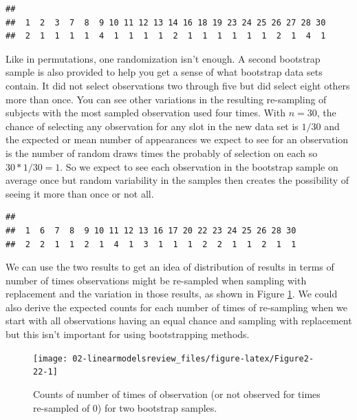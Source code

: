 \documentclass[
]{book}
\newenvironment{Shaded}{\begin{snugshade}}{\end{snugshade}}
\newcommand{\FunctionTok}[1]{\textcolor[rgb]{0.00,0.00,0.00}{#1}}
\newcommand{\NormalTok}[1]{#1}
\newcommand{\OtherTok}[1]{\textcolor[rgb]{0.56,0.35,0.01}{#1}}
\newcommand{\SpecialCharTok}[1]{\textcolor[rgb]{0.00,0.00,0.00}{#1}}
\begin{document}
\begin{verbatim}
## 
##  1  2  3  7  8  9 10 11 12 13 14 16 18 19 23 24 25 26 27 28 30 
##  2  1  1  1  1  4  1  1  1  1  2  1  1  1  1  1  1  2  1  4  1
\end{verbatim}

Like in permutations, one randomization isn't enough. A second bootstrap sample
is also provided to help you get a sense of what bootstrap data sets contain.
It did not select observations two through five but did select eight others more than once.
You can see other variations in the resulting re-sampling of subjects with the
most sampled observation used four times. With \(n = 30\), the chance of
selecting any observation for any slot
in the new data set is \(1/30\) and the expected or mean number of appearances we
expect to see for an observation is the number of random draws times the probably
of selection on each so \(30*1/30 = 1\). So we expect to see each observation in the bootstrap sample on average once but random variability in the samples then creates the possibility of seeing it more than once or not all.

\begin{Shaded}
\end{Shaded}

\begin{verbatim}
## 
##  1  6  7  8  9 10 11 12 13 16 17 20 22 23 24 25 26 28 30 
##  2  2  1  1  2  1  4  1  3  1  1  1  2  2  1  1  2  1  1
\end{verbatim}

We can use the two results to get an idea of distribution of results in terms
of number of times observations might be re-sampled when sampling with
replacement and the variation in those results, as shown in
Figure \ref{fig:Figure2-22}. We could also derive the expected counts for
each number of times of re-sampling when we start with all observations having
an equal chance and sampling with replacement but this isn't important for
using bootstrapping methods.



\begin{figure}[ht!]

{\centering \texttt{[image: 02-linearmodelsreview\_files/figure-latex/Figure2-22-1]} 

}

\caption{Counts of number of times of observation (or not observed for times re-sampled of 0) for two bootstrap samples.}\label{fig:Figure2-22}
\end{figure}
\end{document}
